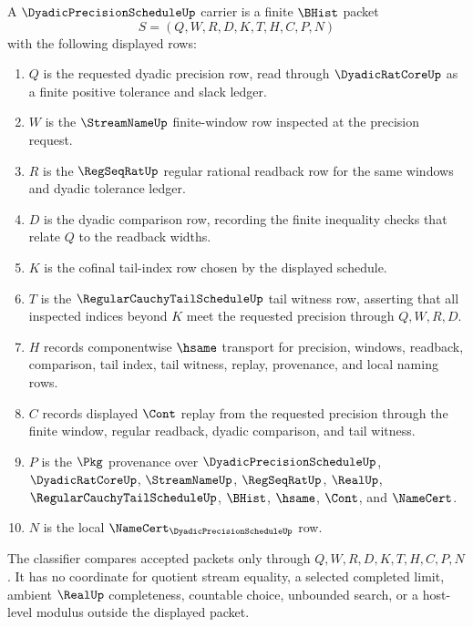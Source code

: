 \begin{definition}
\label{def:dyadic-modulus-schedule-carrier}
A $\DyadicPrecisionScheduleUp$ carrier is a finite $\BHist$ packet
$$
S=(Q,W,R,D,K,T,H,C,P,N)
$$
with the following displayed rows:
\begin{enumerate}
\item $Q$ is the requested dyadic precision row, read through $\DyadicRatCoreUp$ as a finite positive tolerance and slack ledger.
\item $W$ is the $\StreamNameUp$ finite-window row inspected at the precision request.
\item $R$ is the $\RegSeqRatUp$ regular rational readback row for the same windows and dyadic tolerance ledger.
\item $D$ is the dyadic comparison row, recording the finite inequality checks that relate $Q$ to the readback widths.
\item $K$ is the cofinal tail-index row chosen by the displayed schedule.
\item $T$ is the $\RegularCauchyTailScheduleUp$ tail witness row, asserting that all inspected indices beyond $K$ meet the requested precision through $Q,W,R,D$.
\item $H$ records componentwise $\hsame$ transport for precision, windows, readback, comparison, tail index, tail witness, replay, provenance, and local naming rows.
\item $C$ records displayed $\Cont$ replay from the requested precision through the finite window, regular readback, dyadic comparison, and tail witness.
\item $P$ is the $\Pkg$ provenance over $\DyadicPrecisionScheduleUp$, $\DyadicRatCoreUp$, $\StreamNameUp$, $\RegSeqRatUp$, $\RealUp$, $\RegularCauchyTailScheduleUp$, $\BHist$, $\hsame$, $\Cont$, and $\NameCert$.
\item $N$ is the local $\NameCert_{\DyadicPrecisionScheduleUp}$ row.
\end{enumerate}
The classifier compares accepted packets only through $Q,W,R,D,K,T,H,C,P,N$. It has no coordinate for quotient stream equality, a selected completed limit, ambient $\RealUp$ completeness, countable choice, unbounded search, or a host-level modulus outside the displayed packet.
\end{definition}

